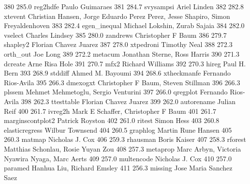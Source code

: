    380    285.0    reg2hdfe      Paulo Guimaraes                         
   381    284.7    svysampsi     Ariel Linden                            
   382    282.8    xtevent       Christian Hansen, Jorge Eduardo Perez   
                                   Perez, Jesse Shapiro, Simon             
                                   Freyaldenhoven                          
   383    282.4    egen_inequal  Michael Lokshin, Zurab Sajaia           
   384    282.0    vselect       Charles Lindsey                         
   385    280.0    zandrews      Christopher F Baum                      
   386    279.7    shapley2      Florian Chavez Juarez                   
   387    278.0    xtpedroni     Timothy Neal                            
   388    272.3    orth_out      Joe Long                                
   389    272.2    metacum       Jonathan Sterne, Ross Harris            
   390    271.3    dcreate       Arne Risa Hole                          
   391    270.7    mfx2          Richard Williams                        
   392    270.3    hireg         Paul H. Bern                            
   393    268.9    stddiff       Ahmed M. Bayoumi                        
   394    268.6    xtheckmanfe   Fernando Rios-Avila                     
   395    266.3    dmexogxt      Christopher F Baum, Steven Stillman     
   396    266.3    plssem        Mehmet Mehmetoglu, Sergio Venturini     
   397    266.0    qregplot      Fernando Rios-Avila                     
   398    262.3    ttesttable    Florian Chavez Juarez                   
   399    262.0    autorename    Julian Reif                             
   400    261.7    ivreg2h       Mark E Schaffer, Christopher F Baum     
   401    261.7    marginscontplot2  Patrick Royston                         
   402    261.0    ritest        Simon Hess                              
   403    260.8    elasticregress  Wilbur Townsend                         
   404    260.5    graphlog      Martin Rune Hansen                      
   405    260.3    matmap        Nicholas J. Cox                         
   406    259.3    rhausman      Boris Kaiser                            
   407    258.3    rforest       Matthias Schonlau, Rosie Yuyan Zou      
   408    257.3    metaprop      Marc Arbyn, Victoria Nyawira Nyaga,     
                                   Marc Aerts                              
   409    257.0    multencode    Nicholas J. Cox                         
   410    257.0    paramed       Hanhua Liu, Richard Emsley              
   411    256.3    missing       Jose Maria Sanchez Saez                 
